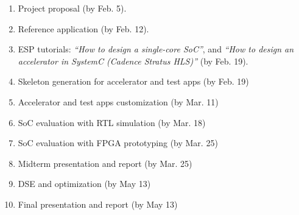 \begin{enumerate}

\item Project proposal (by Feb. 5).
  
\item Reference application (by Feb. 12).

\item ESP tutorials: \emph{``How to design a single-core SoC''}, 
  and \emph{``How to design an accelerator in SystemC (Cadence Stratus HLS)''} (by Feb. 19).

\item Skeleton generation for accelerator and test apps (by Feb. 19)
  
\item Accelerator and test apps customization (by Mar. 11)

\item SoC evaluation with RTL simulation (by Mar. 18)

\item SoC evaluation with FPGA prototyping (by Mar. 25)
  
\item Midterm presentation and report (by Mar. 25)
 
\item DSE and optimization (by May 13)

\item Final presentation and report (by May 13)

\end{enumerate}
